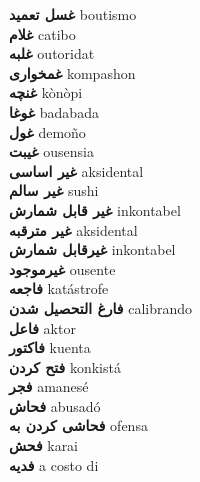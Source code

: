 \textbf{ غسل تعمید  } boutismo \\
\textbf{ غلام  } catibo \\
\textbf{ غلبه  } outoridat \\
\textbf{ غمخواری  } kompashon \\
\textbf{ غنچه  } kònòpi \\
\textbf{ غوغا  } badabada \\
\textbf{ غول  } demoño \\
\textbf{ غیبت  } ousensia \\
\textbf{ غیر اساسی  } aksidental \\
\textbf{ غیر سالم  } sushi \\
\textbf{ غیر قابل شمارش  } inkontabel \\
\textbf{ غیر مترقبه  } aksidental \\
\textbf{ غیرقابل شمارش  } inkontabel \\
\textbf{ غیرموجود  } ousente \\
\textbf{ فاجعه  } katástrofe \\
\textbf{ فارغ التحصیل شدن  } calibrando \\
\textbf{ فاعل  } aktor \\
\textbf{ فاکتور  } kuenta \\
\textbf{ فتح کردن  } konkistá \\
\textbf{ فجر  } amanesé \\
\textbf{ فحاش  } abusadó \\
\textbf{ فحاشی کردن به  } ofensa \\
\textbf{ فحش  } karai \\
\textbf{ فدیه  } a costo di \\
